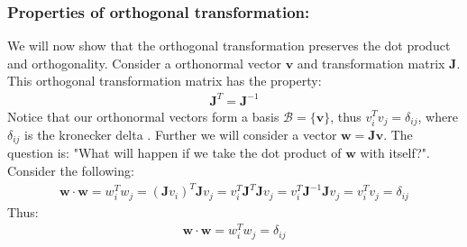 \documentclass[a4paper, 10pt]{article}
\begin{document}
\subsubsection{Properties of orthogonal transformation:} We will now show that the
orthogonal transformation preserves the dot product and orthogonality. Consider
a orthonormal vector $\mathbf{v}$ and transformation matrix $\mathbf{J}$. This orthogonal
transformation matrix has the property:
\begin{align}
  \mathbf{J}^{T} = \mathbf{J}^{-1}
\end{align}
Notice that our orthonormal vectors form a basis $\mathcal{B} = \{\mathbf{v}\}$, thus
$v_{i}^{T}v_{j} = \delta_{ij}$, where $\delta_{ij}$ is the kronecker delta .
Further we will consider a vector $\mathbf{w} =\mathbf{J}\mathbf{v}$. The question is:
"What will happen if we take the dot product of $\mathbf{w}$ with itself?". Consider the following:
\begin{align}
  \mathbf{w}\cdot\mathbf{w} = w_{i}^{T}w_{j} = \left(\mathbf{J}v_{i}\right)^{T}\mathbf{J}v_{j}
  = v_{i}^{T}\mathbf{J}^{T}\mathbf{J}v_{j} =  v_{i}^{T}\mathbf{J}^{-1}\mathbf{J}v_{j} = v_{i}^{T}v_{j}
  = \delta_{ij}
\end{align}
Thus:
\begin{align}
  \mathbf{w}\cdot\mathbf{w} = w_{i}^{T}w_{j} = \delta_{ij}
\end{align}
\end{document}

